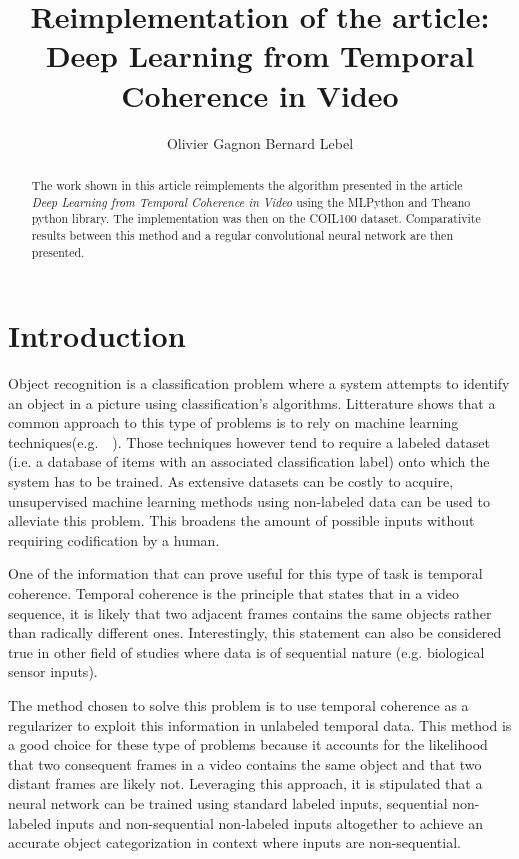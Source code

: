 \documentclass{article} %
\title{Reimplementation of the article:\\ Deep Learning from Temporal Coherence in Video}
\author{
Olivier Gagnon \And Bernard Lebel
}
\begin{document}
\maketitle

\begin{abstract}
The work shown in this article reimplements the algorithm presented in the article \emph{Deep Learning from Temporal Coherence in Video} using the MLPython and Theano python library. The implementation was then on the COIL100 dataset. Comparativite results between this method and a regular convolutional neural network are then presented.
\end{abstract}

\section{Introduction}

Object recognition is a classification problem where a system attempts to identify an object in a picture using classification's algorithms. Litterature shows that a common approach to this type of problems is to rely on machine learning techniques(e.g.~\cite{vision}~\cite{vision2}). Those techniques however tend to require a labeled dataset (i.e. a database of items with an associated classification label) onto which the system has to be trained. As extensive datasets can be costly to acquire, unsupervised machine learning methods using non-labeled data can be used to alleviate this problem. This broadens the amount of possible inputs without requiring codification by a human.

One of the information that can prove useful for this type of task is temporal coherence. Temporal coherence is the principle that states that in a video sequence, it is likely that two adjacent frames contains the same objects rather than radically different ones. Interestingly, this statement can also be considered true in other field of studies where data is of sequential nature (e.g. biological sensor inputs).

The method chosen to solve this problem is to use temporal coherence as a regularizer to exploit this information in unlabeled temporal data.\cite{Mobahi2009}
This method is a good choice for these type of problems because it accounts for the likelihood that two consequent frames in a video contains the same object and that two distant frames are likely not. Leveraging this approach, it is stipulated that a neural network can be trained using standard labeled inputs, sequential non-labeled inputs and non-sequential non-labeled inputs altogether to achieve an accurate object categorization in context where inputs are non-sequential. 
\end{document}
